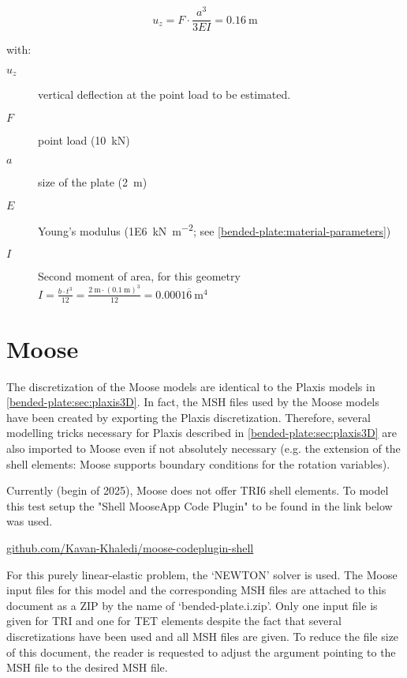 \begin{equation}
    \label{bended-plate:analytical-solution}
    u_z = F \cdot \frac{a ^ 3}{3EI} = \qty{0.16}{\metre}
\end{equation}

\begin{samepage}
    with:
    \begin{description}
        \item[$u_{z}$] vertical deflection at the point load to be estimated.
        \item[$F$] point load (\qty{10}{\kilo\newton})
        \item[$a$] size of the plate (\qty{2}{\metre})
        \item[$E$] Young's modulus (\qty[per-mode = symbol]{1E6}{\kilo\newton\per\square\metre}; see \autoref{bended-plate:material-parameters})
        \item[$I$] Second moment of area, for this geometry $I = \frac{b \cdot t^3}{12} = \frac{\qty{2}{\metre} \cdot (\qty{0.1}{\metre})^3}{12} = 0.0001\overline{6} \qty{}{\metre}^4 $
    \end{description}
\end{samepage}

\section{Moose}
\label{bended-plate:sec:moose}

The discretization of the Moose models are identical to the Plaxis models in
\autoref{bended-plate:sec:plaxis3D}. In fact, the MSH files used by the Moose
models have been created by exporting the Plaxis discretization. Therefore,
several modelling tricks necessary for Plaxis described in
\autoref{bended-plate:sec:plaxis3D} are also imported to Moose even if not
absolutely necessary (e.g. the extension of the shell elements: Moose supports
boundary conditions for the rotation variables).

Currently (begin of 2025), Moose does not offer TRI6 shell elements. To model
this test setup the "Shell MooseApp Code Plugin" to be found in the link below
was used.

\href{https://github.com/Kavan-Khaledi/moose-codeplugin-shell}{github.com/Kavan-Khaledi/moose-codeplugin-shell}

For this purely linear-elastic problem, the ‘NEWTON’ solver is used. The Moose
input files for this model and the corresponding MSH files are attached to this
document as a ZIP by the name of ‘bended-plate.i.zip’. Only one input file is
given for TRI and one for TET elements despite the fact that several
discretizations have been used and all MSH files are given. To reduce the file
size of this document, the reader is requested to adjust the argument pointing
to the MSH file  to the desired MSH file.

